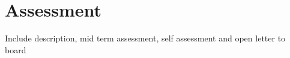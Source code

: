
\chapter{Assessment} %

\label{AppendixE} %

Include description, mid term assessment, self assessment and open letter to board